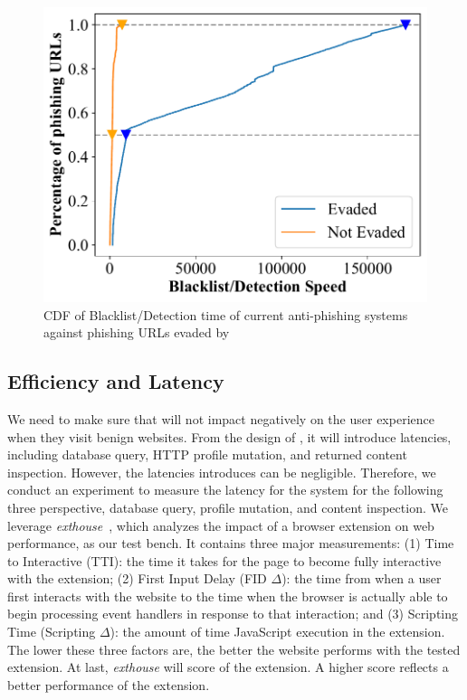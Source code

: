 \begin{figure}
\centering
\includegraphics[width=\linewidth]{figs/evade_bl_time_total.pdf}
\caption{CDF of Blacklist/Detection time of current anti-phishing systems against phishing URLs evaded by \spartacus}
\label{fig:evade_bl_time}
\end{figure}


\subsection{Efficiency and Latency}

We need to make sure that \spartacus will not impact negatively on the user experience when they visit benign websites.
From the design of \spartacus, it will introduce latencies, including database query, HTTP profile mutation, and returned content inspection.
However, the latencies \spartacus introduces can be negligible.
Therefore, we conduct an experiment to measure the latency for the \spartacus system for the following three perspective, database query, profile mutation, and content inspection.
We leverage \emph{exthouse}~\cite{exthouse}, which analyzes the impact of a browser extension on web performance, as our test bench.
It contains three major measurements:
(1) Time to Interactive (TTI): the time it takes for the page to become fully interactive with the extension; 
(2) First Input Delay (FID $\Delta$): the time from when a user first interacts with the website to the time when the browser is actually able to begin processing event handlers in response to that interaction;
and (3) Scripting Time (Scripting $\Delta$): the amount of time JavaScript execution in the extension.
The lower these three factors are, the better the website performs with the tested extension.
At last, \emph{exthouse} will score of the extension.
A higher score reflects a better performance of the extension.

